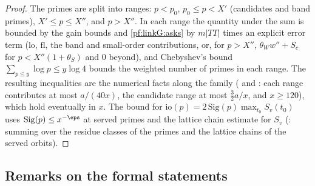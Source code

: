 \begin{proof}
The primes are split into ranges: $p<p_0$, $p_0\le p<X'$ (candidates and band primes), $X'\le p\le X''$, and $p>X''$. In each
range the quantity under the sum is bounded by the gain bounds and \cref{pf:linkG:asks} by $m|TT|$ times an explicit error
term ($\mathrm{lo}$, $\mathrm{fl}$, the band and small-order contributions, or, for $p>X''$, $\theta_Ww''+S_c$ for
$p<X''(1+\theta_S)$ and $0$ beyond), and Chebyshev's bound $\sum_{p\le y}\log p\le y\log4$ \cite{MontgomeryVaughan2007} bounds the
weighted number of primes in each range. The resulting inequalities are the numerical facts along the family
( and :
each range contributes at most $a/(40x)$, the candidate range at most $\frac32a/x$, and $x\ge120$), which hold eventually in
$x$. The bound for $\mathrm{io}(p)=2\,\mathrm{Sig}(p)\max_{t_0}S_v(t_0)$ uses $\mathrm{Sig}(p)\le x^{-\eps}$ at served primes and the
lattice chain estimate for $S_v$ (: summing over
the residue classes of the primes and the lattice chains of the served orbits).
\end{proof}

\subsection{Remarks on the formal statements}\label{sec:pf:linkG:remarks}

